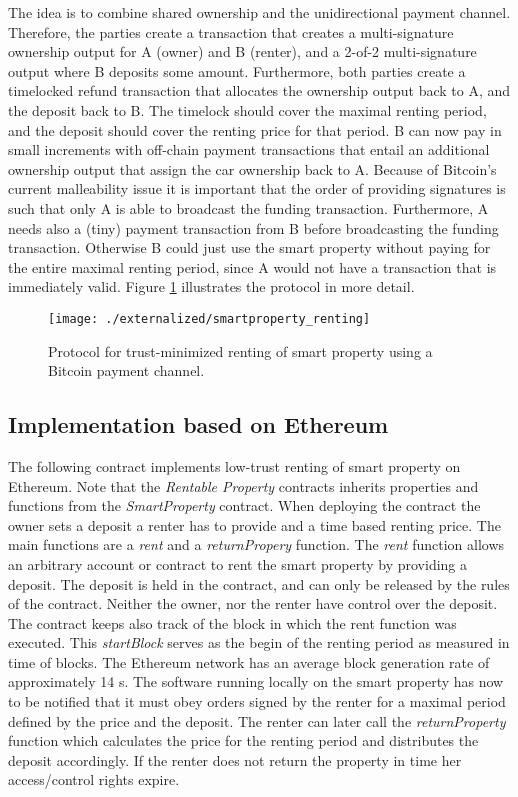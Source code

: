 The idea is to combine shared ownership and the unidirectional payment channel. Therefore, the parties create a transaction that creates a multi-signature ownership output for A (owner) and B (renter), and a 2-of-2 multi-signature output where B deposits some amount. Furthermore, both parties create a timelocked refund transaction that allocates the ownership output back to A, and the deposit back to B. The timelock should cover the maximal renting period, and the deposit should cover the renting price for that period. B can now pay in small increments with off-chain payment transactions that entail an additional ownership output that assign the car ownership back to A. Because of Bitcoin's current malleability issue it is important that the order of providing signatures is such that only A is able to broadcast the funding transaction. Furthermore, A needs also a (tiny) payment transaction from B before broadcasting the funding transaction. Otherwise B could just use the smart property without paying for the entire maximal renting period, since A would not have a transaction that is immediately valid. Figure \ref{fig:smartproperty_renting} illustrates the protocol in more detail.

\begin{figure}[!t]
    \centering
    \texttt{[image: ./externalized/smartproperty\_renting]}
    \caption{Protocol for trust-minimized renting of smart property using a Bitcoin payment channel.}
    \label{fig:smartproperty_renting}
  \end{figure}

\subsection{Implementation based on Ethereum}


The following contract implements low-trust renting of smart property on Ethereum. Note that the \emph{Rentable Property} contracts inherits properties and functions from the \emph{SmartProperty} contract. When deploying the contract the owner sets a deposit a renter has to provide and a time based renting price. The main functions are a \emph{rent} and a \emph{returnPropery} function. The \emph{rent} function allows an arbitrary account or contract to rent the smart property by providing a deposit. The deposit is held in the contract, and can only be released by the rules of the contract. Neither the owner, nor the renter have control over the deposit. The contract keeps also track of the block in which the rent function was executed. This \emph{startBlock} serves as the begin of the renting period as measured in time of blocks. The Ethereum network has an average block generation rate of approximately 14 s. 
The software running locally on the smart property has now to be notified that it must obey orders signed by the renter for a maximal period defined by the price and the deposit. 
The renter can later call the \emph{returnProperty} function which calculates the price for the renting period and distributes the deposit accordingly. If the renter does not return the property in time her access/control rights expire. 

